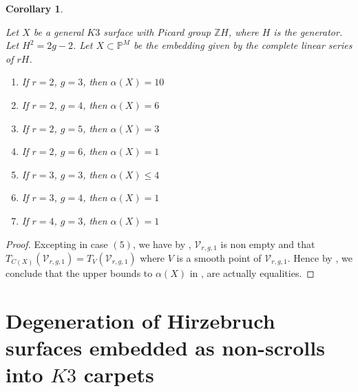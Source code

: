 \documentclass[11pt,twoside]{amsart}
\theoremstyle{plain}
\numberwithin{equation}{section}
\newtheorem{corollary}[theorem]{Corollary}
\theoremstyle{definition}
\begin{document}
\begin{corollary}\label{equality of alpha(x)}

Let $X$ be a general $K3$ surface with Picard group $\mathbb{Z}H$, where $H$ is the generator. Let $H^2 = 2g-2$. Let $X \subset \mathbb{P}^M$ be the embedding given by the complete linear series of $rH$. 
    \begin{enumerate}
        \item If $r = 2$, $g = 3$, then $\alpha(X) = 10$ %
        \item If $r = 2$, $g = 4$, then $\alpha(X) = 6$ 
        \item If $r = 2$, $g = 5$, then $\alpha(X) = 3$ 
        \item If $r = 2$, $g = 6$, then $\alpha(X) = 1$ 
        \item If $r = 3$, $g = 3$, then $\alpha(X) \leq 4$
        \item If $r = 3$, $g = 4$, then $\alpha(X) = 1$ 
        \item If $r = 4$, $g = 3$, then $\alpha(X) = 1$
\end{enumerate}
\end{corollary}

\begin{proof}
    Excepting in case $(5)$, we have by , $\mathcal{V}_{r,g,1}$ is non empty and that $T_{C(X)}(\mathcal{V}_{r,g,1}) = T_V(\mathcal{V}_{r,g,1})$ where $V$ is a smooth point of $\mathcal{V}_{r,g,1}$. Hence by , we conclude that the upper bounds to $\alpha(X)$ in , are actually equalities. 
\end{proof}

\section{Degeneration of Hirzebruch surfaces embedded as non-scrolls into $K3$ carpets}\label{main results}
\end{document}
